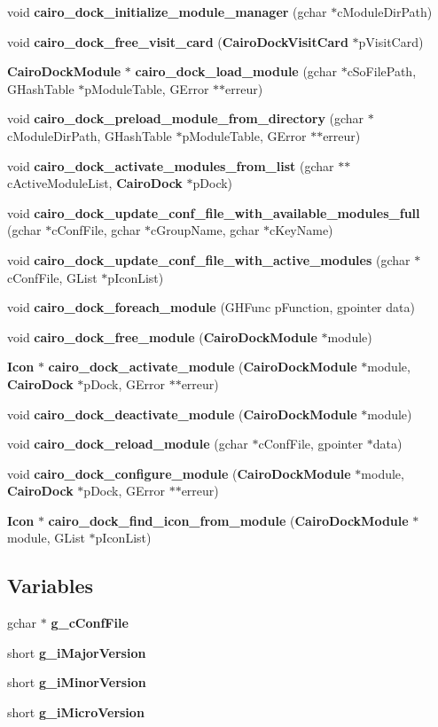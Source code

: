 \begin{CompactItemize}
\item 
void {\bf cairo\_\-dock\_\-initialize\_\-module\_\-manager} (gchar $\ast$c\-Module\-Dir\-Path)
\item 
void {\bf cairo\_\-dock\_\-free\_\-visit\_\-card} ({\bf Cairo\-Dock\-Visit\-Card} $\ast$p\-Visit\-Card)
\item 
{\bf Cairo\-Dock\-Module} $\ast$ {\bf cairo\_\-dock\_\-load\_\-module} (gchar $\ast$c\-So\-File\-Path, GHash\-Table $\ast$p\-Module\-Table, GError $\ast$$\ast$erreur)
\item 
void {\bf cairo\_\-dock\_\-preload\_\-module\_\-from\_\-directory} (gchar $\ast$c\-Module\-Dir\-Path, GHash\-Table $\ast$p\-Module\-Table, GError $\ast$$\ast$erreur)
\item 
void {\bf cairo\_\-dock\_\-activate\_\-modules\_\-from\_\-list} (gchar $\ast$$\ast$c\-Active\-Module\-List, {\bf Cairo\-Dock} $\ast$p\-Dock)
\item 
void {\bf cairo\_\-dock\_\-update\_\-conf\_\-file\_\-with\_\-available\_\-modules\_\-full} (gchar $\ast$c\-Conf\-File, gchar $\ast$c\-Group\-Name, gchar $\ast$c\-Key\-Name)
\item 
void {\bf cairo\_\-dock\_\-update\_\-conf\_\-file\_\-with\_\-active\_\-modules} (gchar $\ast$c\-Conf\-File, GList $\ast$p\-Icon\-List)
\item 
void {\bf cairo\_\-dock\_\-foreach\_\-module} (GHFunc p\-Function, gpointer data)
\item 
void {\bf cairo\_\-dock\_\-free\_\-module} ({\bf Cairo\-Dock\-Module} $\ast$module)
\item 
{\bf Icon} $\ast$ {\bf cairo\_\-dock\_\-activate\_\-module} ({\bf Cairo\-Dock\-Module} $\ast$module, {\bf Cairo\-Dock} $\ast$p\-Dock, GError $\ast$$\ast$erreur)
\item 
void {\bf cairo\_\-dock\_\-deactivate\_\-module} ({\bf Cairo\-Dock\-Module} $\ast$module)
\item 
void {\bf cairo\_\-dock\_\-reload\_\-module} (gchar $\ast$c\-Conf\-File, gpointer $\ast$data)
\item 
void {\bf cairo\_\-dock\_\-configure\_\-module} ({\bf Cairo\-Dock\-Module} $\ast$module, {\bf Cairo\-Dock} $\ast$p\-Dock, GError $\ast$$\ast$erreur)
\item 
{\bf Icon} $\ast$ {\bf cairo\_\-dock\_\-find\_\-icon\_\-from\_\-module} ({\bf Cairo\-Dock\-Module} $\ast$module, GList $\ast$p\-Icon\-List)
\end{CompactItemize}
\subsection*{Variables}
\begin{CompactItemize}
\item 
gchar $\ast$ {\bf g\_\-c\-Conf\-File}
\item 
short {\bf g\_\-i\-Major\-Version}
\item 
short {\bf g\_\-i\-Minor\-Version}
\item 
short {\bf g\_\-i\-Micro\-Version}
\end{CompactItemize}


